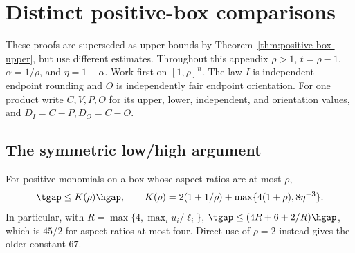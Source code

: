 \section{Distinct positive-box comparisons}\label{app:positive-box-predecessors}
These proofs are superseded as upper bounds by
Theorem~\ref{thm:positive-box-upper}, but use different estimates.
Throughout this appendix $\rho>1$, $t=\rho-1$, $\alpha=1/\rho$, and
$\eta=1-\alpha$. Work first on $[1,\rho]^n$. The law $I$ is independent
endpoint rounding and $O$ is independently fair endpoint orientation.
For one product write $C,V,P,O$ for its upper, lower, independent,
and orientation values, and $D_I=C-P,D_O=C-O$.

\subsection{The symmetric low/high argument}
\begin{proposition}\label{prop:coarse-box}
For positive monomials on a box whose aspect ratios are at most $\rho$,
\[
 \tgap\le K(\rho)\hgap,\qquad
 K(\rho)=2(1+1/\rho)+\max\{4(1+\rho),8\eta^{-3}\}.
\]
In particular, with $R=\max\{4,\max_i u_i/\ell_i\}$,
$\tgap\le(4R+6+2/R)\hgap$, which is $45/2$ for aspect ratios at most
four. Direct use of $\rho=2$ instead gives the older constant $67$.
\end{proposition}
